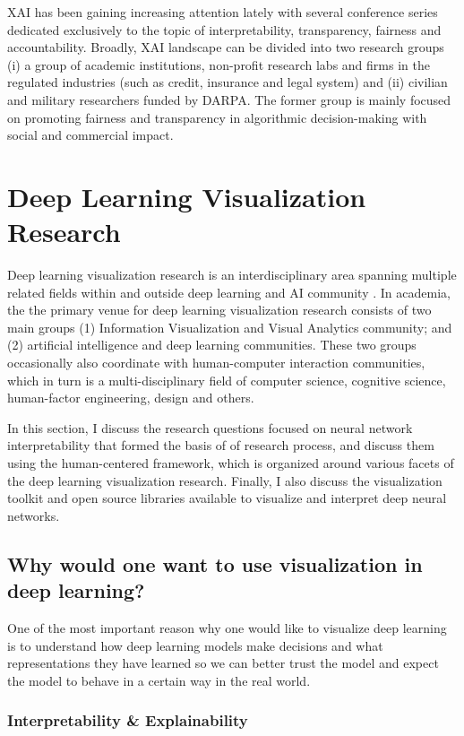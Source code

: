 XAI has been gaining increasing attention lately with several conference series dedicated exclusively to the topic of interpretability, transparency, fairness and accountability. Broadly, XAI landscape can be divided into two research groups (i) a group of academic institutions, non-profit research labs and firms in the regulated industries (such as credit, insurance and legal system) and (ii) civilian and military researchers funded by DARPA. The former group is mainly focused on promoting fairness and transparency in algorithmic decision-making with social and commercial impact.

\section{Deep Learning Visualization Research}

Deep learning visualization research is an interdisciplinary area spanning multiple related fields within and outside deep learning and AI community \cite{Choo2018}. In academia, the the primary venue for deep learning visualization research consists of two main groups (1) Information Visualization and Visual Analytics community; and (2) artificial intelligence and deep learning communities. These two groups occasionally also coordinate with human-computer interaction communities, which in turn is a multi-disciplinary field of computer science, cognitive science, human-factor engineering, design and others.

In this section, I discuss the research questions focused on neural network interpretability that formed the basis of of research process, and discuss them using the human-centered framework, which is organized around various facets of the deep learning visualization research. Finally, I also discuss the visualization toolkit and open source libraries available to visualize and interpret deep neural networks.

\subsection*{Why would one want to use visualization in deep learning?}

One of the most important reason why one would like to visualize deep learning is to understand how deep learning models make decisions and what representations they have learned so we can better trust the model and expect the model to behave in a certain way in the real world.

\subsubsection*{Interpretability \& Explainability }


